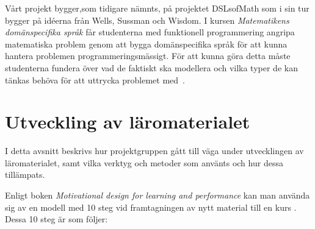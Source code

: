 \documentclass[12pt,a4paper,twoside,openright]{article}
\begin{document}
Vårt projekt bygger,som tidigare nämnts, på projektet DSLsofMath som i sin 
tur bygger på idéerna från Wells, Sussman och Wisdom.
I kursen \textit{Matematikens domänspecifika
 språk} får studenterna med funktionell programmering angripa
matematiska problem genom att bygga domänspecifika språk för att kunna
hantera problemen programmeringsmässigt. För att kunna göra detta
måste studenterna fundera över vad de faktiskt ska modellera och vilka
typer de kan tänkas behöva för att uttrycka problemet
med~\cite{kursplan:dslsofmath}.

\newpage

\section{Utveckling av läromaterialet}
\label{sec:utveckling}



I detta avsnitt beskrivs hur projektgruppen gått till väga under
utvecklingen av läromaterialet, samt vilka verktyg och metoder som
använts och hur dessa tillämpats.

Enligt boken \textit{Motivational design for learning and performance}
kan man använda sig av en modell med 10 steg vid framtagningen av nytt
material till en kurs \cite{motivational_design}. Dessa 10 steg är som följer:
\end{document}
